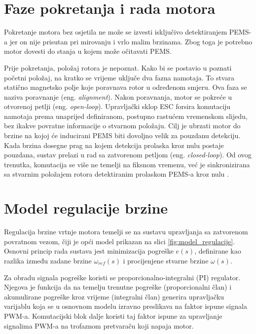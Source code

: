 \documentclass[diplomskirad]{fer}
\begin{document}
\newpage

\section{Faze pokretanja i rada motora}
\label{sec:pokretanje}

Pokretanje motora bez osjetila ne može se izvesti isključivo detektiranjem
PEMS-a jer on nije prisutan pri mirovanju i vrlo malim brzinama. Zbog toga je
potrebno motor dovesti do stanja u kojem može očitavati PEMS.

Prije pokretanja, položaj rotora je nepoznat. Kako bi se postavio u poznati
početni položaj, na kratko se vrijeme uključe dva fazna namotaja. To stvara
statično magnetsko polje koje poravnava rotor u određenom smjeru. Ova faza se
naziva poravnanje (eng. \textit{alignment}). Nakon poravnanja, motor se pokreće
u otvorenoj petlji (eng. \textit{open-loop}). Upravljački sklop ESC forsira
komutaciju namotaja prema unaprijed definiranom, postupno rastućem vremenskom
slijedu, bez ikakve povratne informacije o stvarnom položaju. Cilj je ubrzati
motor do brzine na kojoj će inducirani PEMS biti dovoljno velik za pouzdanu
detekciju. Kada brzina dosegne prag na kojem detekcija prolaska kroz nulu
postaje pouzdana, sustav prelazi u rad sa zatvorenom petljom (eng.
\textit{closed-loop}). Od ovog trenutka, komutacija se više ne temelji na
fiksnom vremenu, već je sinkronizirana sa stvarnim položajem rotora
detektiranim prolaskom PEMS-a kroz nulu \cite{Recasens2021}.

\section{Model regulacije brzine}
\label{sec:model_motora}

Regulacija brzine vrtnje motora temelji se na sustavu upravljanja sa zatvorenom
povratnom vezom, čiji je opći model prikazan na slici
\ref{fig:model_regulacije}. Osnovni princip rada sustava jest minimizacija
pogreške $e(s)$, definirane kao razlika između zadane brzine $\omega_{ref}(s)$
i procijenjene stvarne brzine $\omega(s)$.

Za obradu signala pogreške koristi se proporcionalno-integralni (PI) regulator.
Njegova je funkcija da na temelju trenutne pogreške (proporcionalni član) i
akumulirane pogreške kroz vrijeme (integralni član) generira upravljačku
varijablu koja se u osnovnom modelu izravno preslikava na faktor ispune signala
PWM-a. Komutacijski blok dalje koristi taj faktor ispune za upravljanje
signalima PWM-a na trofaznom pretvaraču koji napaja motor.
\end{document}
